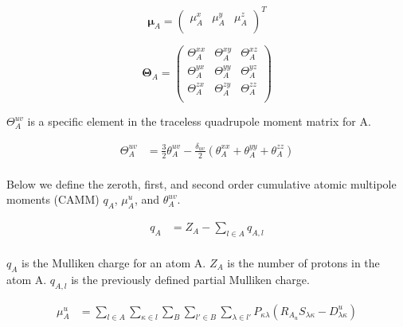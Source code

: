 \begin{equation}
    \pmb{\mu}_A = 
    \begin{pmatrix}
        \mu_A^{x}&
        \mu_A^{y}&
        \mu_A^{z}\\
    \end{pmatrix}^T
\end{equation}

\begin{equation}
    \pmb{\Theta}_A = 
    \begin{pmatrix}
        \Theta_A^{xx} & \Theta_A^{xy} & \Theta_A^{xz}\\
        \Theta_A^{yx} & \Theta_A^{yy} & \Theta_A^{yz}\\
        \Theta_A^{zx} & \Theta_A^{zy} & \Theta_A^{zz}\\
    \end{pmatrix}
\end{equation}

$\Theta_A^{uv}$ is a specific element in the traceless quadrupole moment matrix for A.

\begin{equation}
\begin{split}
        \Theta_A^{uv} &= \frac{3}{2} \theta_A^{uv} - \frac{\delta_{uv}}{2} (\theta_A^{xx} + \theta_A^{yy} + \theta_A^{zz})\\
\end{split}
\end{equation}


Below we define the zeroth, first, and second order cumulative atomic multipole moments (CAMM) $q_A$, $\mu_A^u$, and $\theta_A^{uv}$.

\begin{equation}
\begin{split}
    q_A &= Z_A - \sum_{l \in A} q_{A,l}\\
\end{split}
\end{equation}

$q_A$ is the Mulliken charge for an atom A. $Z_A$ is the number of protons in the atom A. $q_{A,l}$ is the previously defined partial Mulliken charge.

\begin{equation}
\begin{split}
        \mu_A^u &= \sum_{l \in A} \sum_{\kappa \in l} \sum_{B} \sum_{l' \in B} \sum_{\lambda \in l'} P_{\kappa \lambda} (R_{A_u} S_{\lambda \kappa} - D_{\lambda \kappa}^u)\\
\end{split}
\end{equation}

